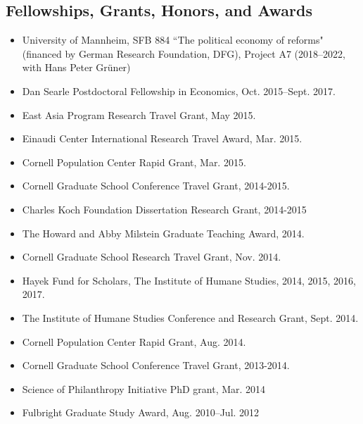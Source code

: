 \documentclass[margin]{res}
\begin{document}
\begin{resume}
\section{Fellowships, Grants, Honors, and Awards}
\begin{itemize}
\item University of Mannheim, SFB 884 ``The political economy of reforms" (financed by German Research Foundation, DFG), Project A7 (2018--2022, with Hans Peter Gr{\"u}ner)
\item Dan Searle Postdoctoral Fellowship in Economics, Oct. 2015--Sept. 2017.
\item East Asia Program Research Travel Grant, May 2015.
\item Einaudi Center International Research Travel Award, Mar. 2015.
\item Cornell Population Center Rapid Grant, Mar. 2015.
\item Cornell Graduate School Conference Travel Grant, 2014-2015.
\item Charles Koch Foundation Dissertation Research Grant, 2014-2015
\item The Howard and Abby Milstein Graduate Teaching Award, 2014.
\item Cornell Graduate School Research Travel Grant, Nov. 2014.
\item Hayek Fund for Scholars, The Institute of Humane Studies, 2014, 2015, 2016, 2017.
\item The Institute of Humane Studies Conference and Research Grant, Sept. 2014.
\item Cornell Population Center Rapid Grant, Aug. 2014.
\item Cornell Graduate School Conference Travel Grant, 2013-2014.
\item Science of Philanthropy Initiative PhD grant, Mar. 2014
\item Fulbright Graduate Study Award, Aug. 2010--Jul. 2012
\end{itemize}

\end{resume}
\end{document}
